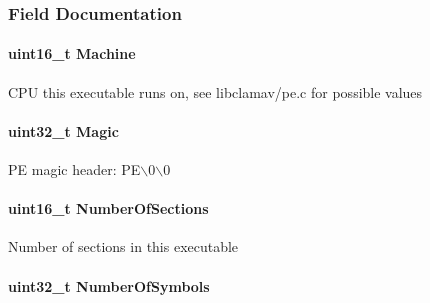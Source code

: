 \subsubsection{Field Documentation}
\hypertarget{structpe__image__file__hdr_a51d503029c67ea2862fe31a71cd4212d}{
\paragraph[{Machine}]{\setlength{\rightskip}{0pt plus 5cm}uint16\_\-t {\bf Machine}}\hfill}
\label{structpe__image__file__hdr_a51d503029c67ea2862fe31a71cd4212d}
CPU this executable runs on, see libclamav/pe.c for possible values \hypertarget{structpe__image__file__hdr_aacdf4d16fc118936413e1bfe23b9e444}{
\paragraph[{Magic}]{\setlength{\rightskip}{0pt plus 5cm}uint32\_\-t {\bf Magic}}\hfill}
\label{structpe__image__file__hdr_aacdf4d16fc118936413e1bfe23b9e444}
PE magic header: PE$\backslash$0$\backslash$0 \hypertarget{structpe__image__file__hdr_aad0798860a6f2bc09b927345db02e074}{
\paragraph[{NumberOfSections}]{\setlength{\rightskip}{0pt plus 5cm}uint16\_\-t {\bf NumberOfSections}}\hfill}
\label{structpe__image__file__hdr_aad0798860a6f2bc09b927345db02e074}
Number of sections in this executable \hypertarget{structpe__image__file__hdr_a4dbc3cb95c8f5dfe95a9c7d346db9844}{
\paragraph[{NumberOfSymbols}]{\setlength{\rightskip}{0pt plus 5cm}uint32\_\-t {\bf NumberOfSymbols}}\hfill}
\label{structpe__image__file__hdr_a4dbc3cb95c8f5dfe95a9c7d346db9844}
